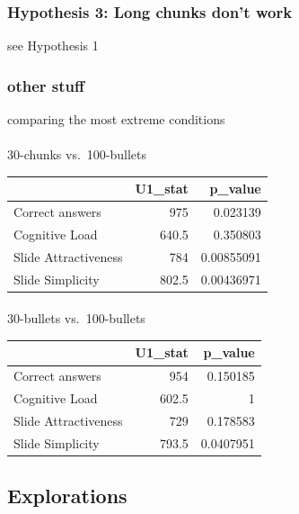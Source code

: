 \documentclass[
  letterpaper,
  DIV=11,
  numbers=noendperiod]{scrartcl}
\makeatletter
\let\oldparagraph\paragraph
\renewcommand{\paragraph}{
    \@ifstar
      \xxxParagraphStar
      \xxxParagraphNoStar
  }
\newcommand{\xxxParagraphStar}[1]{\oldparagraph*{#1}\mbox{}}
\newcommand{\xxxParagraphNoStar}[1]{\oldparagraph{#1}\mbox{}}
\newcounter{none} %
\makeatother
\begin{document}
\subsubsection{Hypothesis 3: Long chunks don't
work}\label{hypothesis-3-long-chunks-dont-work}

see Hypothesis 1

\subsubsection{other stuff}\label{other-stuff}

comparing the most extreme conditions

\paragraph{30-chunks vs.~100-bullets}\label{chunks-vs.-100-bullets-1}

{\def\LTcaptype{none} %
\begin{longtable}[]{@{}lrr@{}}
\toprule\noalign{}
& U1\_stat & p\_value \\
\midrule\noalign{}
\endhead
\bottomrule\noalign{}
\endlastfoot
Correct answers & 975 & 0.023139 \\
Cognitive Load & 640.5 & 0.350803 \\
Slide Attractiveness & 784 & 0.00855091 \\
Slide Simplicity & 802.5 & 0.00436971 \\
\end{longtable}
}

\paragraph{30-bullets vs.~100-bullets}\label{bullets-vs.-100-bullets-2}

{\def\LTcaptype{none} %
\begin{longtable}[]{@{}lrr@{}}
\toprule\noalign{}
& U1\_stat & p\_value \\
\midrule\noalign{}
\endhead
\bottomrule\noalign{}
\endlastfoot
Correct answers & 954 & 0.150185 \\
Cognitive Load & 602.5 & 1 \\
Slide Attractiveness & 729 & 0.178583 \\
Slide Simplicity & 793.5 & 0.0407951 \\
\end{longtable}
}

\subsection{Explorations}\label{explorations}
\end{document}
